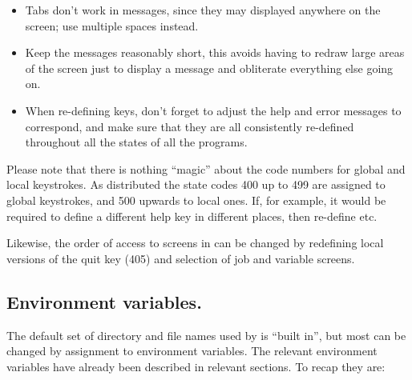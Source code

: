 \begin{itemize}
\item Tabs don't work in messages, since they may displayed anywhere on the screen; use multiple spaces instead.
\item Keep the messages reasonably short, this avoids having to redraw large areas of the screen just to display a message and obliterate
everything else going on.
\item When re-defining keys, don't forget to adjust the help and error messages to correspond, and make sure that they are all
consistently re-defined throughout all the states of all the programs.
\end{itemize}
Please note that there is nothing ``magic'' about the code numbers for global and local keystrokes. As distributed
the state codes 400 up to 499 are assigned to global keystrokes, and 500 upwards to local ones. If, for example, it would be required to
define a different help key in different places, then re-define  etc.

Likewise, the order of access to screens in \PrBtq{} can be changed by redefining local versions of the quit key (405) and
selection of job and variable screens.

\subsection{Environment variables.}
The default set of directory and file names used by \ProductName{} is ``built in'', but most can be changed by
assignment to environment variables. The relevant environment variables have already been described in relevant sections. To recap they are:

